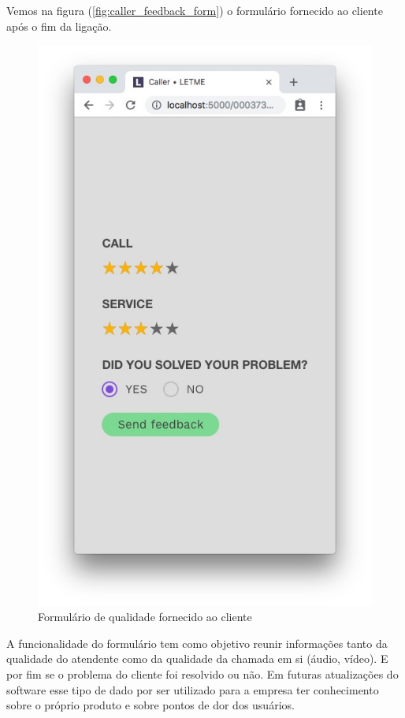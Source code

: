 Vemos na figura (\autoref{fig:caller_feedback_form}) o formulário fornecido ao cliente após o fim da ligação.

\begin{figure}[ht!]
	\centering
    \includegraphics[scale=0.35]{figures/screens/caller-feedback-form.jpg}
	\caption{Formulário de qualidade fornecido ao cliente}
	\label{fig:caller_feedback_form}
\end{figure}

A funcionalidade do formulário tem como objetivo reunir informações tanto da qualidade do atendente como da qualidade da chamada em si (áudio, vídeo). E por fim se o problema do cliente foi resolvido ou não. Em futuras atualizações do software esse tipo de dado por ser utilizado para a empresa ter conhecimento sobre o próprio produto e sobre pontos de dor dos usuários.

